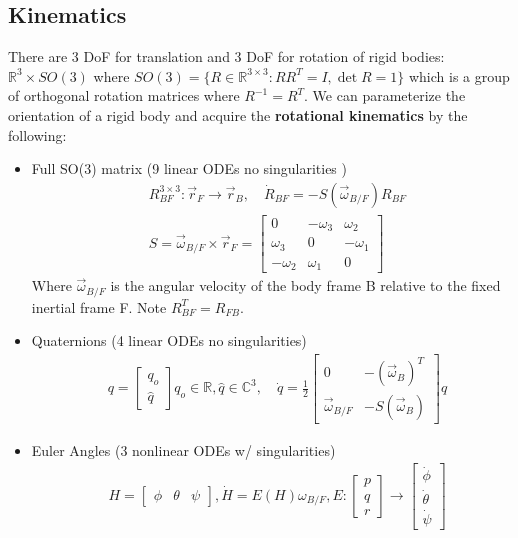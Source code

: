 \documentclass[conference]{IEEEtran}
\begin{document}
\subsection{Kinematics}
There are 3 DoF for translation and 3 DoF for rotation of rigid bodies: $\mathbb{R}^3 \times SO(3)$ where $SO(3) = \{R \in \mathbb{R}^{3 \times 3}: R R^T = I, \det R = 1\}$ which is a group of orthogonal rotation matrices where $R^{-1}=R^T$. We can parameterize the orientation of a rigid body and acquire the \textbf{rotational kinematics} by the following:
\begin{itemize}
    \item Full SO(3) matrix (9 linear ODEs no singularities )\begin{align*}
        & R_{BF}^{3 \times 3}: \vec{r}_F \to \vec{r}_B, \quad \dot{R}_{BF} = -S(\vec{\omega}_{B/F}) R_{BF} \\
        & S = \vec{\omega}_{B/F} \times \vec{r}_F = \begin{bmatrix} 0 & -\omega_3 & \omega_2 \\ \omega_3 & 0 & -\omega_1 \\ -\omega_2 & \omega_1 & 0 \end{bmatrix} 
    \end{align*}
    Where $\vec{\omega}_{B/F}$ is the angular velocity of the body frame B relative to the fixed inertial frame F. Note $R_{BF}^T = R_{FB}$.
    \item Quaternions (4 linear ODEs no singularities) \begin{align*}
        & q = \begin{bmatrix} q_o \\ \hat{q} \end{bmatrix} q_o \in \mathbb{R}, \hat{q} \in \mathbb{C}^3, \quad \dot{q} = \frac{1}{2}\begin{bmatrix}0 & -(\vec{\omega}_B)^T \\ \vec{\omega}_{B/F} & -S(\vec{\omega}_B) \end{bmatrix} q
    \end{align*}
    \item Euler Angles (3 nonlinear ODEs w/ singularities) \begin{align*}
        & H = \begin{bmatrix} \phi & \theta & \psi \end{bmatrix}, \dot{H} = E(H) \omega_{B/F}, E: \begin{bmatrix} p \\ q \\ r \end{bmatrix} \to \begin{bmatrix} \dot{\phi} \\ \dot{\theta} \\ \dot{\psi}\end{bmatrix}

\end{align*}
\end{itemize}
\end{document}
